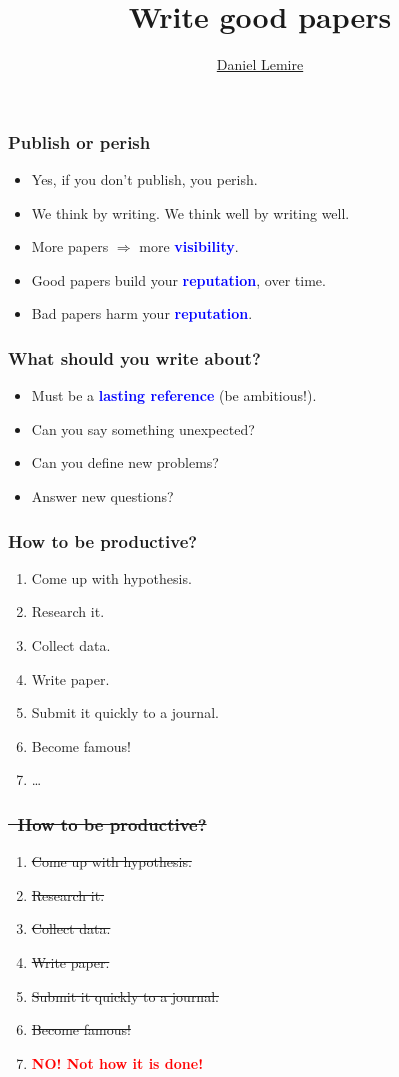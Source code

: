 \documentclass[handout]{beamer}
\title{Write good papers}
\date{}
\author{\href{http://lemire.me/en/}{Daniel Lemire}}
\institute{
	\url{http://lemire.me/en/}\\
	blog: \url{http://lemire.me/blog/}\\
	~\\
}
\date{}
\newcommand{\vimportant}[1]{\textcolor{red}{\textbf{#1}}}
\newcommand{\important}[1]{\textcolor{blue}{\textbf{#1}}}
\begin{document}
\frame{\titlepage}



\frame
{
  \frametitle{Publish or perish}
 \begin{itemize}
  \item<1-> Yes, if you don't publish, you perish.
\item<2-> We think by writing. We think well by writing well.
   \item<3-> More papers $\Rightarrow$ more \important{visibility}.
   \item<4-> Good papers build your \important{reputation}, over time.
   \item<5-> Bad papers harm your \important{reputation}.
 \end{itemize}
}




\frame
{
  \frametitle{What should you write about?}
 \begin{itemize}
  \item<1-> Must be a \important{lasting reference} (be ambitious!).
  \item<2-> Can you say something unexpected?
    \item<3-> Can you define new problems?
    \item<4-> Answer new questions?
  \end{itemize}
}


\frame
{
  \frametitle{How to be productive?}
 \begin{enumerate}
 \item Come up with hypothesis.
  \item Research it.
  \item Collect data.
  \item Write paper.
  \item Submit it quickly to a journal.
  \item Become famous!
  \item \ldots
 \end{enumerate}
}


\frame
{
  \frametitle{\sout{ How to be productive?} }
 \begin{enumerate}
 \item \sout {Come up with hypothesis.}
  \item \sout{ Research it.}
  \item \sout {Collect data.}
  \item \sout {Write paper.}
  \item \sout {Submit it quickly to a journal.}
  \item \sout {Become famous!}
  \item {\Large \vimportant{NO! Not how it is done!}}
 \end{enumerate}
}
\end{document}

